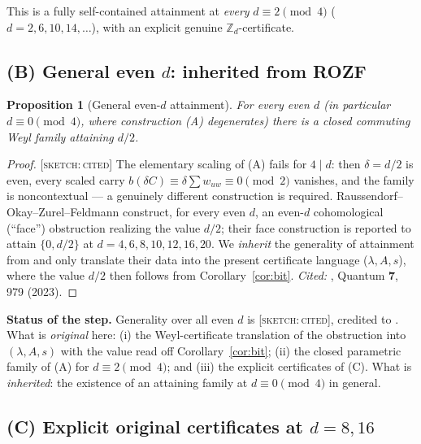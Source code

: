 \documentclass[11pt]{article}
\newtheorem{proposition}[theorem]{Proposition}
\theoremstyle{definition}
\theoremstyle{remark}
\newcommand{\Z}{\mathbb{Z}}
\newcommand{\Zd}{\Z_d}
\newcommand{\SK}{\textnormal{\textsc{[sketch:\,cited]}}}
\newcommand{\flag}[1]{\par\smallskip\noindent\textbf{Status of the step.} #1\par\smallskip}
\begin{document}
\noindent This is a fully self-contained attainment at \emph{every} $d\equiv2\pmod4$
($d=2,6,10,14,\dots$), with an explicit genuine $\Zd$-certificate.

\subsection*{(B) General even $d$: inherited from ROZF}

\begin{proposition}[General even-$d$ attainment]\label{prop:rozf}
For every even $d$ (in particular $d\equiv0\pmod4$, where construction (A) degenerates) there is a
closed commuting Weyl family attaining $d/2$.
\end{proposition}
\begin{proof}
\SK{} The elementary scaling of (A) fails for $4\mid d$: then $\delta=d/2$ is even, every scaled
carry $b(\delta C)\equiv\delta\sum w_{uw}\equiv0\pmod2$ vanishes, and the family is noncontextual ---
a genuinely different construction is required. Raussendorf--Okay--Zurel--Feldmann \cite{ROZF}
construct, for every even $d$, an even-$d$ cohomological (``face'') obstruction realizing the value
$d/2$; their face construction is reported to attain $\{0,d/2\}$ at $d=4,6,8,10,12,16,20$. We
\emph{inherit} the generality of attainment from \cite{ROZF} and only translate their data into the
present certificate language ($\lambda,A,s$), where the value $d/2$ then follows from
Corollary~\ref{cor:bit}. \emph{Cited:} \cite{ROZF}, Quantum \textbf{7}, 979 (2023).
\end{proof}
\flag{Generality over all even $d$ is \SK, credited to \cite{ROZF}. What is \emph{original} here:
(i) the Weyl-certificate translation of the obstruction into $(\lambda,A,s)$ with the value read off
Corollary~\ref{cor:bit}; (ii) the closed parametric family of (A) for $d\equiv2\pmod4$; and (iii)
the explicit certificates of (C). What is \emph{inherited}: the existence of an attaining family at
$d\equiv0\pmod4$ in general.}

\subsection*{(C) Explicit original certificates at $d=8,16$}
\end{document}
